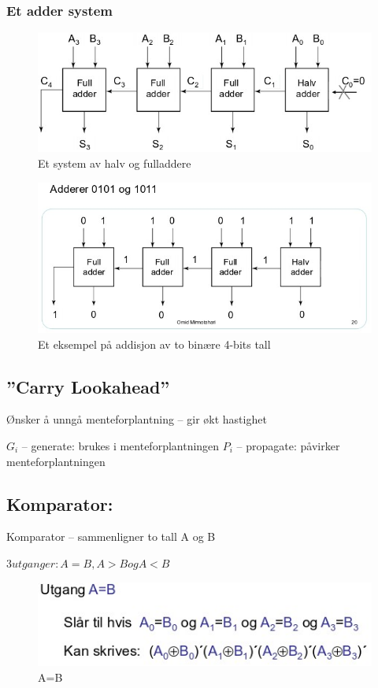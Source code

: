 \documentclass{article}
\begin{document}
	\subsubsection{Et adder system}
	\begin{figure}[H]
		\includegraphics[scale = 0.6]{adderment.jpg}
		\caption{Et system av halv og fulladdere}
	\end{figure}
	
	\begin{figure}[H]
		\includegraphics[scale = 0.6]{addeks.jpg}
		\caption{Et eksempel på addisjon av to binære 4-bits tall}
	\end{figure}
	
	\subsection{”Carry Lookahead”}
	 Ønsker å unngå menteforplantning – gir økt hastighet
	 
	 $G_i$ – generate: brukes i menteforplantningen
	 $P_i$ – propagate: påvirker menteforplantningen
	
	\subsection{Komparator:}
	Komparator – sammenligner to tall A og B 
	
	$3 utganger: A=B, A>B og A<B$
	
	\begin{figure}[H]
		\includegraphics[scale = 0.6]{komp1.jpg}
		\caption{A=B}
	\end{figure}
	
\end{document}
